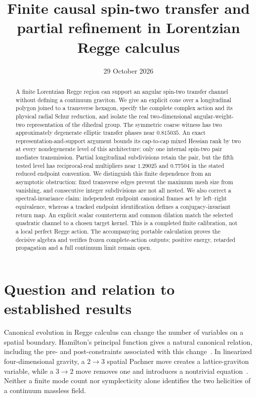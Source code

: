\documentclass[11pt]{article}
\title{Finite causal spin-two transfer and partial refinement in Lorentzian Regge calculus}
\author{}
\date{29 October 2026}
\theoremstyle{remark}\newtheorem{remark}[theorem]{Remark}
\begin{document}
\maketitle
\begin{abstract}
A finite Lorentzian Regge region can support an angular spin-two transfer channel without defining a continuum graviton.
We give an explicit cone over a longitudinal polygon joined to a transverse hexagon, specify the complete complex action and its physical radial Schur reduction, and isolate the real two-dimensional angular-weight-two representation of the dihedral group.
The symmetric coarse witness has two approximately degenerate elliptic transfer phases near $0.815035$.
An exact representation-and-support argument bounds its cap-to-cap mixed Hessian rank by two at every nondegenerate level of this architecture: only one internal spin-two pair mediates transmission.
Partial longitudinal subdivisions retain the pair, but the fifth tested level has reciprocal-real multipliers near $1.29025$ and $0.77504$ in the stated reduced endpoint convention.
We distinguish this finite dependence from an asymptotic obstruction: fixed transverse edges prevent the maximum mesh size from vanishing, and consecutive integer subdivisions are not all nested.
We also correct a spectral-invariance claim: independent endpoint canonical frames act by left--right equivalence, whereas a tracked endpoint identification defines a conjugacy-invariant return map.
An explicit scalar counterterm and common dilation match the selected quadratic channel to a chosen target kernel.
This is a completed finite calibration, not a local perfect Regge action.
The accompanying portable calculation proves the decisive algebra and verifies frozen complete-action outputs; positive energy, retarded propagation and a full continuum limit remain open.
\end{abstract}

\section{Question and relation to established results}
\label{sec:intro}
Canonical evolution in Regge calculus can change the number of variables on a spatial boundary.
Hamilton's principal function gives a natural canonical relation, including the pre- and post-constraints associated with this change~\cite{DittrichHoehn2012,Hoehn2014}.
In linearized four-dimensional gravity, a $2\to3$ spatial Pachner move creates a lattice-graviton variable, while a $3\to2$ move removes one and introduces a nontrivial equation~\cite{Hoehn2015}.
Neither a finite mode count nor symplecticity alone identifies the two helicities of a continuum massless field.
\end{document}
